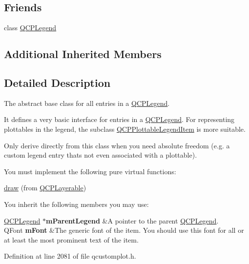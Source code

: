\subsection*{Friends}
\begin{DoxyCompactItemize}
\item 
class \hyperlink{class_q_c_p_abstract_legend_item_a8429035e7adfbd7f05805a6530ad5e3b}{Q\+C\+P\+Legend}
\end{DoxyCompactItemize}
\subsection*{Additional Inherited Members}


\subsection{Detailed Description}
The abstract base class for all entries in a \hyperlink{class_q_c_p_legend}{Q\+C\+P\+Legend}. 

It defines a very basic interface for entries in a \hyperlink{class_q_c_p_legend}{Q\+C\+P\+Legend}. For representing plottables in the legend, the subclass \hyperlink{class_q_c_p_plottable_legend_item}{Q\+C\+P\+Plottable\+Legend\+Item} is more suitable.

Only derive directly from this class when you need absolute freedom (e.\+g. a custom legend entry that\textquotesingle{}s not even associated with a plottable).

You must implement the following pure virtual functions\+: \begin{DoxyItemize}
\item \hyperlink{class_q_c_p_abstract_legend_item_a97dedc084c672359710f16b31d046d1d}{draw} (from \hyperlink{class_q_c_p_layerable}{Q\+C\+P\+Layerable})\end{DoxyItemize}
You inherit the following members you may use\+: \begin{TabularC}{2}
\hline
\hyperlink{class_q_c_p_legend}{Q\+C\+P\+Legend} $\ast${\bfseries m\+Parent\+Legend}  &A pointer to the parent \hyperlink{class_q_c_p_legend}{Q\+C\+P\+Legend}. \\
Q\+Font {\bfseries m\+Font}  &The generic font of the item. You should use this font for all or at least the most prominent text of the item.  \\
\end{TabularC}


Definition at line 2081 of file qcustomplot.\+h.



